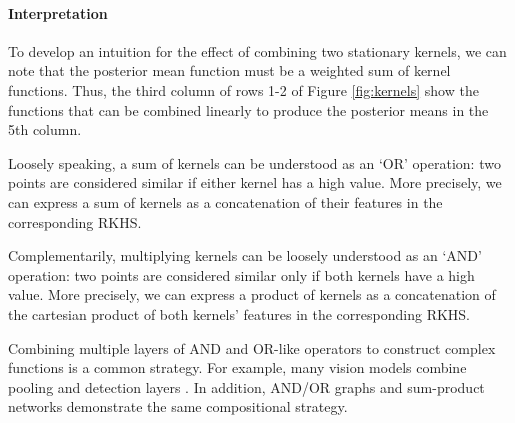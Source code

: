 \documentclass[twoside]{article}
\begin{document}

\paragraph{Interpretation}

To develop an intuition for the effect of combining two stationary kernels, we can note that the posterior mean function must be a weighted sum of kernel functions.  Thus, the third column of rows 1-2 of Figure \ref{fig:kernels} show the functions that can be combined linearly to produce the posterior means in the 5th column.

Loosely speaking, a sum of kernels can be understood as an `OR' operation: two points are considered similar if either kernel has a high value.
More precisely, we can express a sum of kernels as a concatenation of their features in the corresponding RKHS.

Complementarily, multiplying kernels can be loosely understood as an `AND' operation: two points are considered similar only if both kernels have a high value.
More precisely, we can express a product of kernels as a concatenation of the cartesian product of both kernels' features in the corresponding RKHS.

Combining multiple layers of AND and OR-like operators to construct complex functions is a common strategy.  For example, many vision models combine pooling and detection layers . In addition, AND/OR graphs  and sum-product networks  demonstrate the same compositional strategy.


\end{document}

